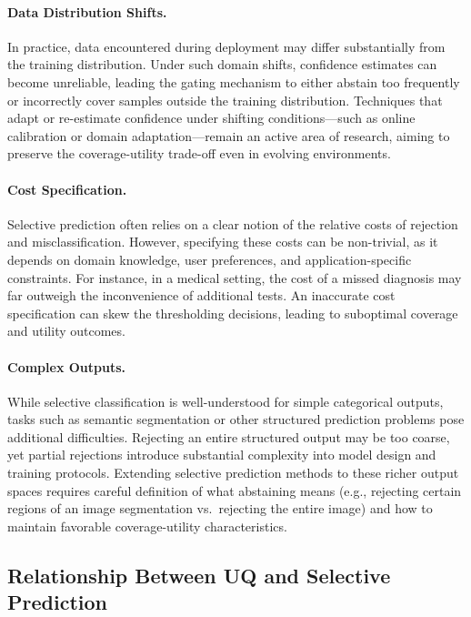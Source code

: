 \paragraph{Data Distribution Shifts.}
In practice, data encountered during deployment may differ substantially from the training distribution. Under such domain shifts, confidence estimates can become unreliable, leading the gating mechanism to either abstain too frequently or incorrectly cover samples outside the training distribution. Techniques that adapt or re-estimate confidence under shifting conditions—such as online calibration or domain adaptation—remain an active area of research, aiming to preserve the coverage-utility trade-off even in evolving environments.

\paragraph{Cost Specification.}
Selective prediction often relies on a clear notion of the relative costs of rejection and misclassification. However, specifying these costs can be non-trivial, as it depends on domain knowledge, user preferences, and application-specific constraints. For instance, in a medical setting, the cost of a missed diagnosis may far outweigh the inconvenience of additional tests. An inaccurate cost specification can skew the thresholding decisions, leading to suboptimal coverage and utility outcomes.

\paragraph{Complex Outputs.}
While selective classification is well-understood for simple categorical outputs, tasks such as semantic segmentation or other structured prediction problems pose additional difficulties. Rejecting an entire structured output may be too coarse, yet partial rejections introduce substantial complexity into model design and training protocols. Extending selective prediction methods to these richer output spaces requires careful definition of what abstaining means (e.g., rejecting certain regions of an image segmentation vs.\ rejecting the entire image) and how to maintain favorable coverage-utility characteristics.


\subsection{Relationship Between UQ and Selective Prediction}

